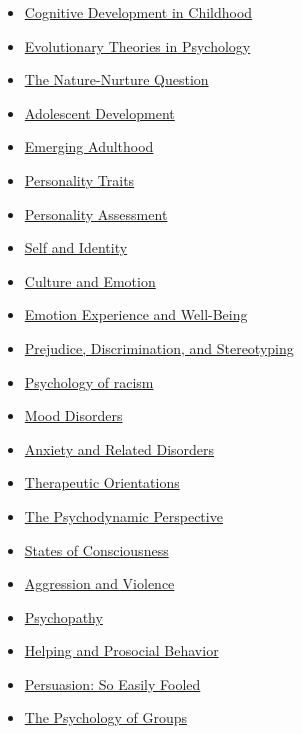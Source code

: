 \documentclass[
]{article}
\begin{document}
\begin{itemize}
\item
  \href{http://nobaproject.com/modules/cognitive-development-in-childhood}{Cognitive Development in Childhood}
\item
  \href{http://nobaproject.com/modules/evolutionary-theories-in-psychology}{Evolutionary Theories in Psychology}
\item
  \href{http://nobaproject.com/modules/the-nature-nurture-question}{The Nature-Nurture Question}
\item
  \href{http://nobaproject.com/modules/adolescent-development}{Adolescent Development}
\item
  \href{http://nobaproject.com/modules/emerging-adulthood}{Emerging Adulthood}
\item
  \href{http://nobaproject.com/modules/personality-traits}{Personality Traits}
\item
  \href{http://nobaproject.com/modules/personality-assessment}{Personality Assessment}
\item
  \href{http://nobaproject.com/modules/self-and-identity}{Self and Identity}
\item
  \href{http://nobaproject.com/modules/culture-and-emotion}{Culture and Emotion}
\item
  \href{http://nobaproject.com/modules/emotion-experience-and-well-being}{Emotion Experience and Well-Being}
\item
  \href{http://nobaproject.com/modules/prejudice-discrimination-and-stereotyping}{Prejudice, Discrimination, and Stereotyping}
\item
  \href{https://nobaproject.com/modules/psychology-of-racism}{Psychology of racism}
\item
  \href{http://nobaproject.com/modules/mood-disorders}{Mood Disorders}
\item
  \href{http://nobaproject.com/modules/anxiety-and-related-disorders}{Anxiety and Related Disorders}
\item
  \href{http://nobaproject.com/modules/therapeutic-orientations}{Therapeutic Orientations}
\item
  \href{http://nobaproject.com/modules/the-psychodynamic-perspective}{The Psychodynamic Perspective}
\item
  \href{http://nobaproject.com/modules/states-of-consciousness}{States of Consciousness}
\item
  \href{http://nobaproject.com/modules/aggression-and-violence}{Aggression and Violence}
\item
  \href{http://nobaproject.com/modules/psychopathy}{Psychopathy}
\item
  \href{http://nobaproject.com/modules/helping-and-prosocial-behavior}{Helping and Prosocial Behavior}
\item
  \href{http://nobaproject.com/modules/persuasion-so-easily-fooled}{Persuasion: So Easily Fooled}
\item
  \href{http://nobaproject.com/modules/the-psychology-of-groups}{The Psychology of Groups}
\end{itemize}
\end{document}
